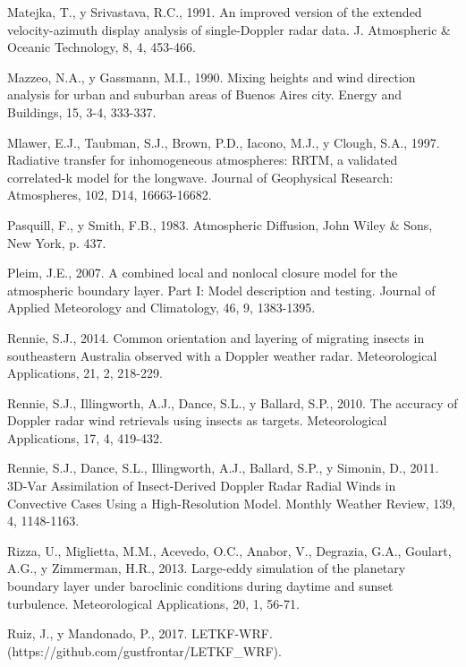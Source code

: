 \documentclass[12pt,spanish,oneside, a4paper]{book}
\begin{document}
\hypertarget{ref-Matejka1991}{}
Matejka, T., y Srivastava, R.C., 1991. An improved version of the
extended velocity-azimuth display analysis of single-Doppler radar data.
J. Atmospheric \& Oceanic Technology, 8, 4, 453-466.

\hypertarget{ref-Mazzeo1990}{}
Mazzeo, N.A., y Gassmann, M.I., 1990. Mixing heights and wind direction
analysis for urban and suburban areas of Buenos Aires city. Energy and
Buildings, 15, 3-4, 333-337.

\hypertarget{ref-Mlawer1997}{}
Mlawer, E.J., Taubman, S.J., Brown, P.D., Iacono, M.J., y Clough, S.A.,
1997. Radiative transfer for inhomogeneous atmospheres: RRTM, a
validated correlated-k model for the longwave. Journal of Geophysical
Research: Atmospheres, 102, D14, 16663-16682.

\hypertarget{ref-Pasquill1983}{}
Pasquill, F., y Smith, F.B., 1983. Atmospheric Diffusion, John Wiley \&
Sons, New York, p. 437.

\hypertarget{ref-Pleim2007}{}
Pleim, J.E., 2007. A combined local and nonlocal closure model for the
atmospheric boundary layer. Part I: Model description and testing.
Journal of Applied Meteorology and Climatology, 46, 9, 1383-1395.

\hypertarget{ref-Rennie2014}{}
Rennie, S.J., 2014. Common orientation and layering of migrating insects
in southeastern Australia observed with a Doppler weather radar.
Meteorological Applications, 21, 2, 218-229.

\hypertarget{ref-Rennie2010}{}
Rennie, S.J., Illingworth, A.J., Dance, S.L., y Ballard, S.P., 2010. The
accuracy of Doppler radar wind retrievals using insects as targets.
Meteorological Applications, 17, 4, 419-432.

\hypertarget{ref-Rennie2011}{}
Rennie, S.J., Dance, S.L., Illingworth, A.J., Ballard, S.P., y Simonin,
D., 2011. 3D-Var Assimilation of Insect-Derived Doppler Radar Radial
Winds in Convective Cases Using a High-Resolution Model. Monthly Weather
Review, 139, 4, 1148-1163.

\hypertarget{ref-Rizza2013}{}
Rizza, U., Miglietta, M.M., Acevedo, O.C., Anabor, V., Degrazia, G.A.,
Goulart, A.G., y Zimmerman, H.R., 2013. Large-eddy simulation of the
planetary boundary layer under baroclinic conditions during daytime and
sunset turbulence. Meteorological Applications, 20, 1, 56-71.

\hypertarget{ref-Ruiz2017}{}
Ruiz, J., y Mandonado, P., 2017. LETKF-WRF.
(https://github.com/gustfrontar/LETKF\_WRF).
\end{document}
